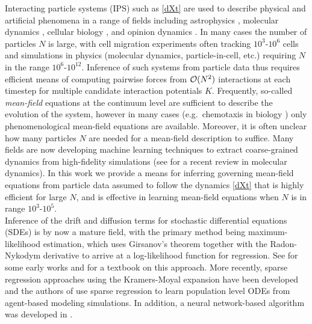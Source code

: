 \documentclass[english,reqno]{amsart}
\begin{document}
Interacting particle systems (IPS) such as \eqref{dXt} are used to describe physical and artificial phenomena in a range of fields including astrophysics \cite{warren1992astrophysical,guo2021progress}, molecular dynamics \cite{lelievre2016partial}, cellular biology \cite{sepulveda2013collective,van2015simulating,bi2016motility}, and opinion dynamics \cite{blondel2010continuous}. In many cases the number of particles $N$ is large, with cell migration experiments often tracking $10^3$-$10^6$ cells and simulations in physics (molecular dynamics, particle-in-cell, etc.) requiring $N$ in the range $10^6$-$10^{12}$. Inference of such systems from particle data thus requires efficient means of computing pairwise forces from ${\mathcal{O}}(N^2)$ interactions at each timestep for multiple candidate interaction potentials $K$. Frequently, so-called {\it mean-field} equations at the continuum level are sufficient to describe the evolution of the system, however in many cases (e.g.\ chemotaxis in biology \cite{keller1971model}) only phenomenological mean-field equations are available. Moreover, it is often unclear how many particles $N$ are needed for a mean-field description to suffice. Many fields are now developing machine learning techniques to extract coarse-grained dynamics from high-fidelity simulations (see \cite{gkeka2020machine} for a recent review in molecular dynamics).  In this work we provide a means for inferring governing mean-field equations from particle data assumed to follow the dynamics \eqref{dXt} that is highly efficient for large $N$, and is effective in learning mean-field equations when $N$ is in range $10^3$-$10^5$.\\   

Inference of the drift and diffusion terms for stochastic differential equations (SDEs) is by now a mature field,  with the primary method being maximum-likelihood estimation, which uses Girsanov's theorem together with the Radon-Nykodym derivative to arrive at a log-likelihood function for regression. See \cite{bibby1995martingale,lo1988maximum} for some early works and \cite{bishwal2007parameter} for a textbook on this approach. More recently, sparse regression approaches using the Kramers-Moyal expansion have been developed \cite{boninsegna2018sparse,callaham2021nonlinear,li2021extracting} and the authors of \cite{nardini2021learning} use sparse regression to learn population level ODEs from agent-based modeling simulations. In addition, a neural network-based algorithm was developed in \cite{chen2021solving}. \\
\end{document}
